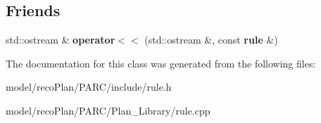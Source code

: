 \subsection*{Friends}
\begin{DoxyCompactItemize}
\item 
\mbox{\label{classrule_aaf5146e3508ab979d741cdada3c6e2b2}} 
std\+::ostream \& {\bfseries operator$<$$<$} (std\+::ostream \&, const \textbf{ rule} \&)
\end{DoxyCompactItemize}


The documentation for this class was generated from the following files\+:\begin{DoxyCompactItemize}
\item 
model/reco\+Plan/\+P\+A\+R\+C/include/rule.\+h\item 
model/reco\+Plan/\+P\+A\+R\+C/\+Plan\+\_\+\+Library/rule.\+cpp\end{DoxyCompactItemize}
